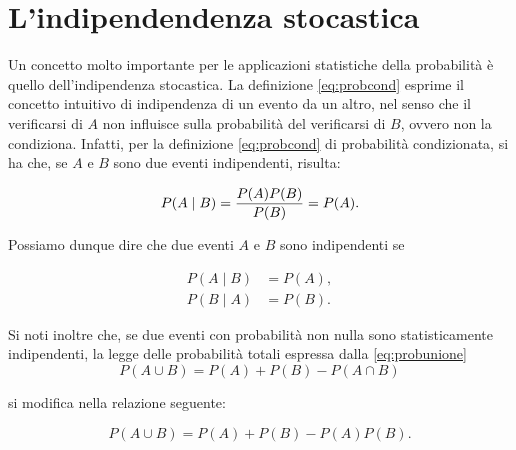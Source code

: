 \documentclass[
  11pt,
]{krantz}
\theoremstyle{definition}
\theoremstyle{definition}
\theoremstyle{definition}
\theoremstyle{definition}
\theoremstyle{remark}
\begin{document}
\hypertarget{lindipendendenza-stocastica}{%
\section{L'indipendendenza stocastica}\label{lindipendendenza-stocastica}}

Un concetto molto importante per le applicazioni statistiche della probabilità è quello dell'indipendenza stocastica. La definizione \eqref{eq:probcond} esprime il concetto intuitivo di indipendenza di un evento da un altro, nel senso che il verificarsi di \(A\) non influisce sulla probabilità del verificarsi di \(B\), ovvero non la condiziona. Infatti, per la definizione \eqref{eq:probcond} di probabilità condizionata, si ha che, se \(A\) e \(B\) sono due eventi indipendenti, risulta:

\[
P(A \mid B) = \frac{P(A)P(B)}{P(B)} = P(A).\notag
\]

Possiamo dunque dire che due eventi \(A\) e \(B\) sono indipendenti se

\begin{equation}
\begin{split}
P(A \mid B) &= P(A), \\
P(B \mid A) &= P(B).
\end{split}
\end{equation}

Si noti inoltre che, se due eventi con probabilità non nulla sono statisticamente indipendenti, la legge delle probabilità totali espressa dalla \eqref{eq:probunione} \begin{equation}
P(A \cup B) = P(A) + P(B) - P(A \cap B)
\label{eq:probunione}
\end{equation}

si modifica nella relazione seguente:

\begin{equation}
P(A \cup B) = P(A) + P(B) - P(A)P(B).
\end{equation}
\end{document}
